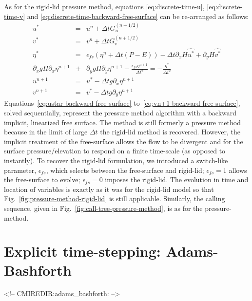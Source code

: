 As for the rigid-lid pressure method, equations
\ref{eq:discrete-time-u}, \ref{eq:discrete-time-v} and
\ref{eq:discrete-time-backward-free-surface} can be re-arranged as follows:
\begin{eqnarray}
u^{*} & = & u^{n} + \Delta t G_u^{(n+1/2)} \label{eq:ustar-backward-free-surface} \\
v^{*} & = & v^{n} + \Delta t G_v^{(n+1/2)} \label{eq:vstar-backward-free-surface} \\
\eta^* & = & \epsilon_{fs} \left( \eta^{n} + \Delta t (P-E) \right)- \Delta t 
  \partial_x H \widehat{u^{*}}
+ \partial_y H \widehat{v^{*}}
\\
  \partial_x g H \partial_x \eta^{n+1}
& + & \partial_y g H \partial_y \eta^{n+1}
 - \frac{\epsilon_{fs} \eta^{n+1}}{\Delta t^2}
 = 
- \frac{\eta^*}{\Delta t^2}
\label{eq:elliptic-backward-free-surface}
\\
u^{n+1} & = & u^{*} - \Delta t g \partial_x \eta^{n+1} \label{eq:un+1-backward-free-surface}\\
v^{n+1} & = & v^{*} - \Delta t g \partial_y \eta^{n+1} \label{eq:vn+1-backward-free-surface}
\end{eqnarray}
Equations~\ref{eq:ustar-backward-free-surface}
to~\ref{eq:vn+1-backward-free-surface}, solved sequentially, represent
the pressure method algorithm with a backward implicit, linearized
free surface. The method is still formerly a pressure method because
in the limit of large $\Delta t$ the rigid-lid method is
recovered. However, the implicit treatment of the free-surface allows
the flow to be divergent and for the surface pressure/elevation to
respond on a finite time-scale (as opposed to instantly). To recover
the rigid-lid formulation, we introduced a switch-like parameter,
$\epsilon_{fs}$, which selects between the free-surface and rigid-lid;
$\epsilon_{fs}=1$ allows the free-surface to evolve; $\epsilon_{fs}=0$
imposes the rigid-lid. The evolution in time and location of variables
is exactly as it was for the rigid-lid model so that
Fig.~\ref{fig:pressure-method-rigid-lid} is still
applicable. Similarly, the calling sequence, given in
Fig.~\ref{fig:call-tree-pressure-method}, is as for the
pressure-method.


\section{Explicit time-stepping: Adams-Bashforth}
\label{sect:adams-bashforth}
\begin{rawhtml}
<!-- CMIREDIR:adams_bashforth: -->
\end{rawhtml}

